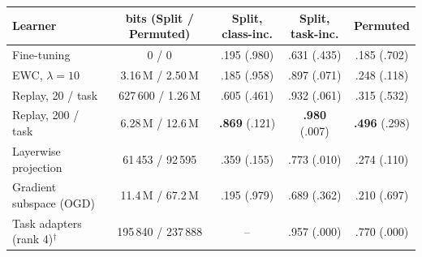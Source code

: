 \begin{tabular}{lcccc}
\toprule
Learner & bits (Split / Permuted) & Split, class-inc. & Split, task-inc. & Permuted \\
\midrule
Fine-tuning & 0 / 0 & .195 (.980) & .631 (.435) & .185 (.702) \\
EWC, $\lambda=10$ & 3.16\,M / 2.50\,M & .185 (.958) & .897 (.071) & .248 (.118) \\
Replay, 20 / task & 627\,600 / 1.26\,M & .605 (.461) & .932 (.061) & .315 (.532) \\
Replay, 200 / task & 6.28\,M / 12.6\,M & \textbf{.869} (.121) & \textbf{.980} (.007) & \textbf{.496} (.298) \\
Layerwise projection & 61\,453 / 92\,595 & .359 (.155) & .773 (.010) & .274 (.110) \\
Gradient subspace (OGD) & 11.4\,M / 67.2\,M & .195 (.979) & .689 (.362) & .210 (.697) \\
Task adapters (rank 4)$^{\dagger}$ & 195\,840 / 237\,888 & -- & .957 (.000) & .770 (.000) \\
\bottomrule
\end{tabular}
